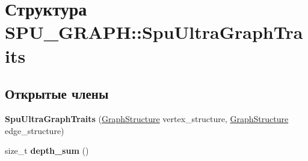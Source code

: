 \hypertarget{struct_s_p_u___g_r_a_p_h_1_1_spu_ultra_graph_traits}{}\section{Структура S\+P\+U\+\_\+\+G\+R\+A\+PH\+:\+:Spu\+Ultra\+Graph\+Traits}
\label{struct_s_p_u___g_r_a_p_h_1_1_spu_ultra_graph_traits}
\subsection*{Открытые члены}
\begin{DoxyCompactItemize}
\item 
\mbox{\label{struct_s_p_u___g_r_a_p_h_1_1_spu_ultra_graph_traits_a8dfb5c8586fa1c4a45758792dbdf8307}} 
{\bfseries Spu\+Ultra\+Graph\+Traits} (\hyperlink{class_s_p_u___g_r_a_p_h_1_1_graph_structure}{Graph\+Structure} vertex\+\_\+structure, \hyperlink{class_s_p_u___g_r_a_p_h_1_1_graph_structure}{Graph\+Structure} edge\+\_\+structure)
\item 
\mbox{\label{struct_s_p_u___g_r_a_p_h_1_1_spu_ultra_graph_traits_a3b534d027aa8a6ab62fa33b43f0cddb8}} 
size\+\_\+t {\bfseries depth\+\_\+sum} ()
\end{DoxyCompactItemize}
